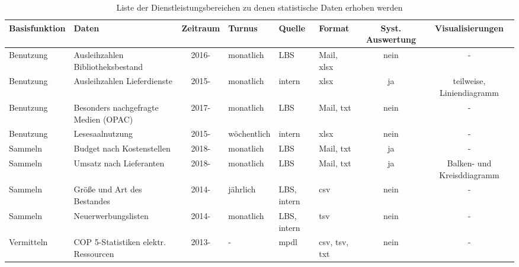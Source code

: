 \begin{table}[h]
    \centering
    \begin{adjustbox}{max width=\textwidth}
    \Huge
    \begin{tabular}{llclllcc}
       \toprule
       \textbf{Basisfunktion}               &\textbf{Daten}                                 &\textbf{Zeitraum} &\textbf{Turnus}    &\textbf{Quelle}  &\textbf{Format}          &\textbf{Syst. Auswertung} & \textbf{Visualisierungen}\\
       \midrule     
            Benutzung                       & Ausleihzahlen Bibliotheksbestand              & 2016-             & monatlich         & LBS          & Mail, xlsx                & nein  & -\\
            Benutzung                       & Ausleihzahlen Lieferdienste                   & 2015-             & monatlich         & intern       & xlsx                      & ja    & teilweise, Liniendiagramm\\ 
            Benutzung                       & Besonders nachgefragte Medien (OPAC)          & 2017-             & monatlich         & LBS          & Mail, txt                 & nein  & -\\ 
            Benutzung                       & Lesesaalnutzung                               & 2015-             & wöchentlich       & intern       & xlsx                      & nein  & -\\ 
            Sammeln                         & Budget nach Kostenstellen                   & 2018-               & monatlich         & LBS          & Mail, txt                 & ja    & -\\ 
            Sammeln                         & Umsatz nach Lieferanten                     & 2018-               & monatlich         & LBS          & Mail, txt                 & ja    & Balken- und Kreisddiagramm\\ 
            Sammeln                         & Größe und Art des Bestandes                   & 2014-             & jährlich          & LBS, intern  & csv                       & nein  & -\\ 
            Sammeln                         & Neuerwerbungslisten                           & 2014-             & monatlich         & LBS, intern  & tsv                       & nein  & -\\ 
            Vermitteln                      & \acrshort{COP 5}-Statistiken elektr. Ressourcen& 2013-            & -                 & mpdl         & csv, tsv, txt             & nein  & -\\ 

        \bottomrule
    \end{tabular}
    \end{adjustbox}
    \caption{%
        Liste der Dienstleistungsbereichen zu denen statistische Daten erhoben werden
    \label{tab:Statistische_Daten}
    }
     \end{table}
